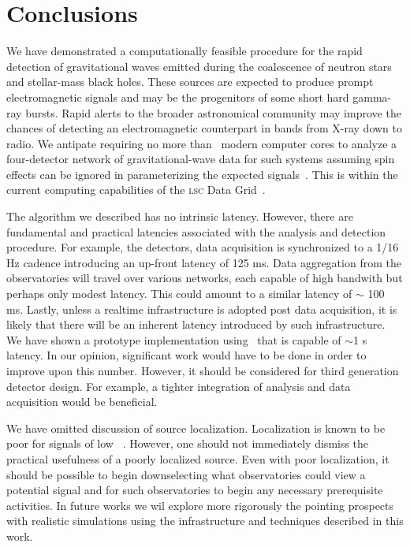 \section{Conclusions}
\label{SECV}\label{sec:conclusions}

We have demonstrated a computationally feasible procedure for the rapid
detection of gravitational waves emitted during the coalescence of neutron
stars and stellar-mass black holes.  These sources are expected to produce
prompt electromagnetic signals and may be the progenitors of some short hard
gamma-ray bursts.  Rapid alerts to the broader astronomical community may
improve the chances of detecting an electromagnetic counterpart in bands from
X-ray down to radio.  We antipate requiring no more than \numcpus\ modern
computer cores to analyze a four-detector network of gravitational-wave data
for such systems assuming spin effects can be ignored in parameterizing the
expected signals~\cite{the-papers-that-say-that-is-okay}.  This is within the
current computing capabilities of the \textsc{lsc} Data Grid~\cite{LDG}.

The algorithm we described has no intrinsic latency.  However, there are
fundamental and practical latencies associated with the analysis and detection
procedure. For example, the \LIGO{} detectors, data acquisition is synchronized
to a 1/16 Hz cadence introducing an up-front latency of 125 ms.  Data
aggregation from the observatories will travel over various networks, each
capable of high bandwith but perhaps only modest latency.  This could amount to
a similar latency of $\sim$ 100 ms.  Lastly, unless a realtime infrastructure is
adopted post data acquisition, it is likely that there will be an inherent
latency introduced by such infrastructure.  We have shown a prototype
implementation using \gstlal\ that is capable of $\sim$1 s latency. In our
opinion, significant work would have to be done in order to improve upon this
number. However, it should be considered for third generation detector design.
For example, a tighter integration of analysis and data acquisition would be
beneficial.

We have omitted discussion of source localization. Localization is known to
be poor for signals of low \SNR~\cite{Fairhurst2009}.
However, one should not immediately dismiss the practical usefulness of a
poorly localized source. Even with poor localization, it should be possible to
begin downselecting what observatories could view a potential signal and for
such observatories to begin any necessary prerequisite activities. In future
works we wil explore more rigorously the pointing prospects with realistic
simulations using the infrastructure and techniques described in this work.

